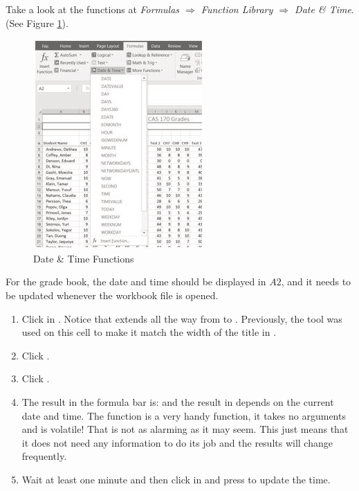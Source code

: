 Take a look at the functions at \textit{Formulas $ \Rightarrow $ Function Library $ \Rightarrow $ Date \& Time}. (See Figure \ref{03:fig16}).

\begin{figure}[H]
	\centering
	\includegraphics[width=\maxwidth{.95\linewidth}]{gfx/ch03_fig16}
	\caption{Date \& Time Functions}
	\label{03:fig16}
\end{figure}

For the grade book, the date and time should be displayed in $ A2 $, and it needs to be updated whenever the workbook file is opened.

\begin{enumerate}
	\item Click in . Notice that  extends all the way from  to . Previously, the  tool was used on this cell to make it match the width of the title in .
	\item Click . 
	\item Click .
	\item The result in the formula bar is:  and the result in  depends on the current date and time. The  function is a very handy function, it takes no arguments and is volatile! That is not as alarming as it may seem. This just means that it does not need any information to do its job and the results will change frequently. 
	\item Wait at least one minute and then click in  and press  to update the time.
\end{enumerate}

